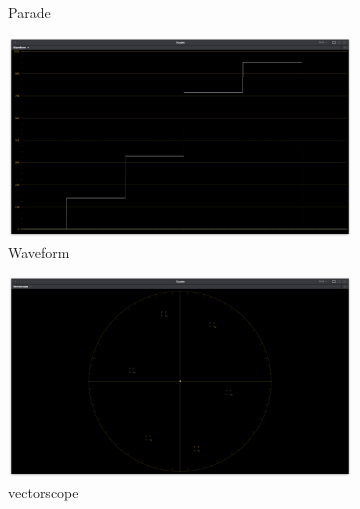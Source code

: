 \begin{figure}[ht!]
\begin{subfigure}[b]{0.475\textwidth}
            \caption[Parade]%
            {{\small Parade}}    
            \label{fig:parade-p3d60}
        \end{subfigure}
        \quad
        \begin{subfigure}[b]{0.475\textwidth}   
            \centering 
            \includegraphics[width=\textwidth]{images/p3d60/p3d60_waveform}
            \caption[]%
            {{\small Waveform}}    
            \label{fig:wf-p3d60}
        \end{subfigure}
        \begin{subfigure}[b]{0.475\textwidth}   
            \centering 
            \includegraphics[width=\textwidth]{images/p3d60/p3d60_vectorscope}
            \caption[]%
            {{\small vectorscope}}    
            \label{fig:vect-p3d60}
        \end{subfigure}
        \quad
        \begin{subfigure}[b]{0.475\textwidth}   
            \centering 

\end{subfigure}
\end{figure}
